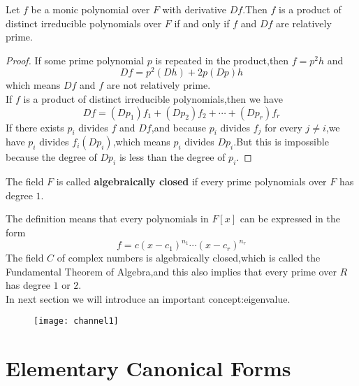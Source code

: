 \documentclass{article}
\begin{document}
\begin{thm}
	Let $f$ be a monic polynomial over $F$ with derivative $Df$.Then $f$ is a product of distinct irreducible polynomials over $F$ if and only if $f$ and $Df$ are relatively prime. 
\end{thm}
\begin{proof}
	If some prime polynomial $p$ is repeated in the product,then $f=p^2h$ and 
	\[Df=p^2(Dh)+2p(Dp)h\]
	which means $Df$ and $f$ are not relatively prime.\\
	If $f$ is a product of distinct irreducible polynomials,then we have
	\[Df=(Dp_1)f_1+(Dp_2)f_2+\cdots+(Dp_r)f_r\]
	If there exists $p_i$ divides $f$ and $Df$,and because $p_i$ divides $f_j$ for every $j\neq i$,we have $p_i$ divides $f_i(Dp_i)$,which means $p_i$ divides $Dp_i$.But this is impossible because the degree of $Dp_i$ is less than the degree of $p_i$.
\end{proof}
\begin{dde}
	The field $F$ is called \textbf{algebraically closed} if every prime polynomials over $F$ has degree $1$.
\end{dde}
The definition means that every polynomials in $F[x]$ can be expressed in the form
\[f=c(x-c_1)^{n_1}\cdots(x-c_r)^{n_r}\]
The field $C$ of complex numbers is algebraically closed,which is called the Fundamental Theorem of Algebra,and this also implies that every prime over $R$ has degree $1$ or $2$.\\
\indent In next section we will introduce an important concept:eigenvalue.
\begin{figure}[htbp]
	\centering
	\texttt{[image: channel1]}
\end{figure}
\section{Elementary Canonical Forms}
\end{document}
